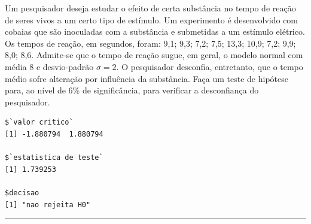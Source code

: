 \documentclass[a4paper,11pt,fleqn]{article}\usepackage[]{graphicx}\usepackage[]{color}
\makeatletter
\newenvironment{kframe}{%
 \def\at@end@of@kframe{}%
 \ifinner\ifhmode%
  \def\at@end@of@kframe{\end{minipage}}%
  \begin{minipage}{\columnwidth}%
 \fi\fi%
 \def\FrameCommand##1{\hskip\@totalleftmargin \hskip-\fboxsep
 \colorbox{shadecolor}{##1}\hskip-\fboxsep
     \hskip-\linewidth \hskip-\@totalleftmargin \hskip\columnwidth}%
 \MakeFramed {\advance\hsize-\width
   \@totalleftmargin\z@ \linewidth\hsize
   \@setminipage}}%
 {\par\unskip\endMakeFramed%
 \at@end@of@kframe}
\newenvironment{knitrout}{}{} %
\theoremstyle{definition}
\makeatother
\begin{document}
\begin{compactenum}[19.] %
\item Um pesquisador deseja estudar o efeito de certa substância no
  tempo de reação de seres vivos a um certo tipo de estímulo. Um
  experimento é desenvolvido com cobaias que são inoculadas com a
  substância e submetidas a um estímulo elétrico. Os tempos de reação,
  em segundos, foram: 9,1; 9,3; 7,2; 7,5; 13,3; 10,9; 7,2; 9,9; 8,0;
  8,6. Admite-se que o tempo de reação sugue, em geral, o modelo normal
  com média 8 e desvio-padrão $\sigma = 2$. O pesquisador desconfia,
  entretanto, que o tempo médio sofre alteração por influência da
  substância. Faça um teste de hipótese para, ao nível de 6\% de
  significância, para verificar a desconfiança do pesquisador.
\begin{knitrout}\small
{}\color{fgcolor}\begin{kframe}
\begin{verbatim}
$`valor critico`
[1] -1.880794  1.880794

$`estatistica de teste`
[1] 1.739253

$decisao
[1] "nao rejeita H0"
\end{verbatim}
\end{kframe}
\end{knitrout}
\end{compactenum}

\vspace{0.3cm}
\hrule
\vspace{0.3cm}
\end{document}
